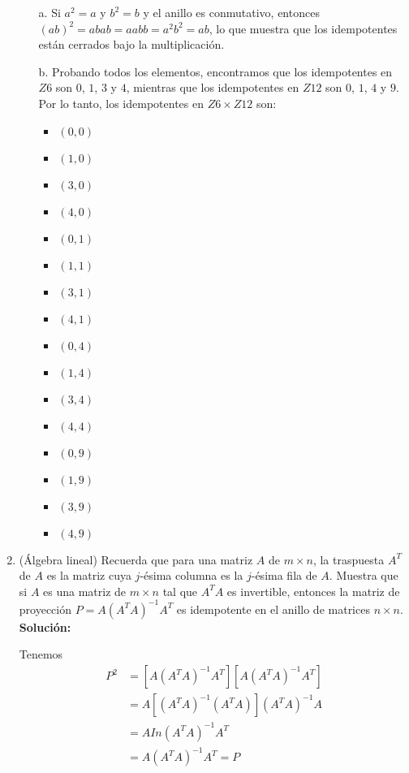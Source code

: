 \begin{enumerate}
	\begin{itemize}
		\item[a.] 	Si $a^2 = a$ y $b^2 = b$ y el anillo es conmutativo, entonces $(ab)^2 = abab = aabb = a^2b^2 = ab$, lo que muestra que los idempotentes están cerrados bajo la multiplicación.
		\item[b.] Probando todos los elementos, encontramos que los idempotentes en $Z6$ son $0$, $1$, $3$ y $4$, mientras que los idempotentes en $Z12$ son $0$, $1$, $4$ y $9$. Por lo tanto, los idempotentes en $Z6 \times Z12$ son:
		\begin{multicols}{2}
			\begin{itemize}
				
				\item $(0, 0)$
				\item $(1, 0)$
				\item $(3, 0)$
				\item $(4, 0)$
				\item $(0, 1)$
				\item $(1, 1)$
				\item $(3, 1)$
				\item $(4, 1)$
				\item $(0, 4)$
				\item $(1, 4)$
				\item $(3, 4)$
				\item $(4, 4)$
				\item $(0, 9)$
				\item $(1, 9)$
				\item $(3, 9)$
				\item $(4, 9)$
			\end{itemize}
		\end{multicols}
		
	\end{itemize}
	
	\item (Álgebra lineal) Recuerda que para una matriz $A$ de $m \times n$, la traspuesta $A^T$ de $A$ es la matriz cuya $j$-ésima columna es la $j$-ésima fila de $A$. Muestra que si $A$ es una matriz de $m \times n$ tal que $A^TA$ es invertible, entonces la matriz de proyección $P = A(A^TA)^{-1}A^T$ es idempotente en el anillo de matrices $n \times n$.
	\\ \textbf{Solución:}
	
	Tenemos 
	\begin{align*}
		P^2 &= [A(A^TA)^{-1}A^T][A(A^TA)^{-1}A^T]\\
		&= A[(A^TA)^{-1}(A^TA)](A^TA)^{-1}A \\
		&= AIn(A^TA)^{-1}A^T \\ &= A(A^TA)^{-1}A^T = P
	\end{align*}
	

\end{enumerate}
